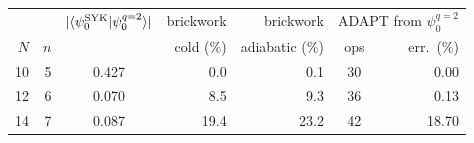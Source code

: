 \begin{tabular}{r r c r r c r}
\toprule
 & & $|\langle\psi_0^{\rm SYK}|\psi_0^{q=2}\rangle|$ & brickwork & brickwork & \multicolumn{2}{c}{ADAPT from $\psi_0^{q=2}$} \\
$N$ & $n$ & & cold (\%) & adiabatic (\%) & ops & err.\ (\%) \\
\midrule
10 & 5 & 0.427 & 0.0 & 0.1 & 30 & 0.00 \\
12 & 6 & 0.070 & 8.5 & 9.3 & 36 & 0.13 \\
14 & 7 & 0.087 & 19.4 & 23.2 & 42 & 18.70 \\
\bottomrule
\end{tabular}
